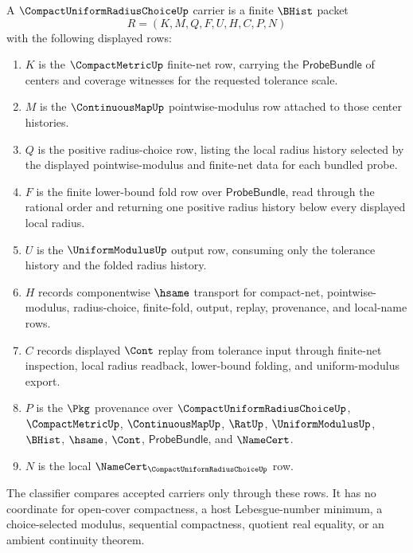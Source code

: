 \begin{definition}
\label{def:compact-uniform-radius-choice-carrier}
A $\CompactUniformRadiusChoiceUp$ carrier is a finite $\BHist$ packet
$$
R=(K,M,Q,F,U,H,C,P,N)
$$
with the following displayed rows:
\begin{enumerate}
\item $K$ is the $\CompactMetricUp$ finite-net row, carrying the $\mathsf{ProbeBundle}$ of centers and coverage witnesses for the requested tolerance scale.
\item $M$ is the $\ContinuousMapUp$ pointwise-modulus row attached to those center histories.
\item $Q$ is the positive radius-choice row, listing the local radius history selected by the displayed pointwise-modulus and finite-net data for each bundled probe.
\item $F$ is the finite lower-bound fold row over $\mathsf{ProbeBundle}$, read through the rational order and returning one positive radius history below every displayed local radius.
\item $U$ is the $\UniformModulusUp$ output row, consuming only the tolerance history and the folded radius history.
\item $H$ records componentwise $\hsame$ transport for compact-net, pointwise-modulus, radius-choice, finite-fold, output, replay, provenance, and local-name rows.
\item $C$ records displayed $\Cont$ replay from tolerance input through finite-net inspection, local radius readback, lower-bound folding, and uniform-modulus export.
\item $P$ is the $\Pkg$ provenance over $\CompactUniformRadiusChoiceUp$, $\CompactMetricUp$, $\ContinuousMapUp$, $\RatUp$, $\UniformModulusUp$, $\BHist$, $\hsame$, $\Cont$, $\mathsf{ProbeBundle}$, and $\NameCert$.
\item $N$ is the local $\NameCert_{\CompactUniformRadiusChoiceUp}$ row.
\end{enumerate}
The classifier compares accepted carriers only through these rows. It has no coordinate for open-cover compactness, a host Lebesgue-number minimum, a choice-selected modulus, sequential compactness, quotient real equality, or an ambient continuity theorem.
\end{definition}

